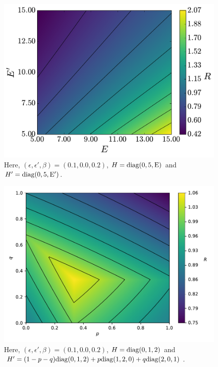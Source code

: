 \documentclass[pra,
aps,
twocolumn,
superscriptaddress,
groupedaddress,
nofootinbib,
reprint
]{revtex4-1}
\begin{document}
\begin{figure}
    \centering
    \includegraphics[scale=0.4]{figs/test/R_vs_E2.pdf}
    \caption{Here, $(\epsilon, \epsilon', \beta) = (0.1, 0.0, 0.2)$, $H = \rm{diag}(0,5,E)$ and $H' = \rm{diag}(0,5,E')$.
    }
    \label{fig:rvse2}
\end{figure}

\begin{figure}
    \centering
    \includegraphics[scale=0.4]{figs/test/R_vs_H.pdf}
    \caption{Here, $(\epsilon, \epsilon', \beta) = (0.1, 0.0, 0.2)$, $H = {\rm{diag}}(0,1,2)$ and $H' = (1-p-q){\rm{diag}}(0,1,2)+p{\rm{diag}}(1,2,0)+q{\rm{diag}}(2,0,1)$.
    }
    \label{fig:rvsh}
\end{figure}
\end{document}
